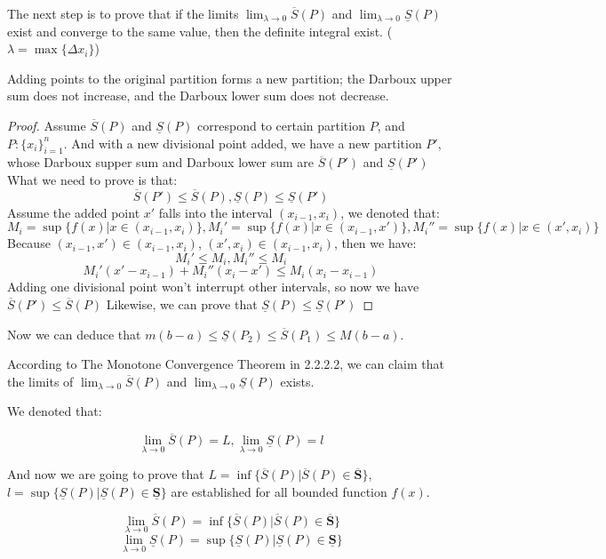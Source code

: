 The next step is to prove that if the limits $\lim_{\lambda \to 0} \overline{S}(P)$ and $\lim_{\lambda \to 0} \underline{S}(P)$ exist and converge to the same value, then the definite integral exist. ($\lambda = \max \{\Delta x_i\}$)

\begin{lemma}
Adding points to the original partition forms a new partition; the Darboux upper sum does not increase, and the Darboux lower sum does not decrease.
\end{lemma}

\begin{proof}
Assume $\overline{S}(P)$ and $\underline{S}(P)$ correspond to certain partition $P$, and $P: \{x_i\}_{i=1}^n$. And with a new divisional point added, we have a new partition $P'$, whose Darboux supper sum and Darboux lower sum are $\overline{S}(P')$ and $\underline{S}(P')$
What we need to prove is that:
\[
\overline{S}(P') \leq \overline{S}(P), \underline{S}(P) \leq \underline{S}(P')
\]
Assume the added point $x'$ falls into the interval $(x_{i-1},x_i)$, we denoted that:
\[
M_i = \sup \{f(x)|x \in (x_{i-1},x_i)\}, M_i' = \sup \{f(x)|x \in (x_{i-1},x')\}, M_i'' = \sup \{f(x)| x \in (x', x_i)\}
\]
Because $(x_{i-1},x') \in (x_{i-1},x_i)$, $(x', x_i) \in (x_{i-1},x_i)$, then we have:
\[
M_i' \leq M_i, M_i'' \leq M_i
\]
\[
M_i'(x'-x_{i-1}) + M_i''(x_i-x') \leq M_i(x_i - x_{i-1})
\]
Adding one divisional point won't interrupt other intervals, so now we have $\overline{S}(P') \leq \overline{S}(P)$
Likewise, we can prove that $\underline{S}(P) \leq \underline{S}(P')$

\end{proof}

Now we can deduce that $m(b-a) \leq \underline{S}(P_2) \leq \overline{S}(P_1) \leq M(b-a)$.

According to The Monotone Convergence Theorem in 2.2.2.2, we can claim that the limits of $\lim_{\lambda \to 0} \overline{S}(P)$ and $\lim_{\lambda \to 0} \underline{S}(P)$ exists.

We denoted that:

\[
\lim_{\lambda \to 0} \overline{S}(P)=L, \lim_{\lambda \to 0} \underline{S}(P)=l
\]

And now we are going to prove that $L = \inf \{\overline{S}(P)|\overline{S}(P) \in \overline{\textbf{S}}\}$, $l = \sup \{\underline{S}(P)|\underline{S}(P) \in \underline{\textbf{S}}\}$ are established for all bounded function $f(x)$.

\begin{lemma}
\[\lim_{\lambda \to 0} \overline{S}(P) = \inf \{\overline{S}(P)|\overline{S}(P) \in \overline{\textbf{S}}\}\]
\[\lim_{\lambda \to 0} \underline{S}(P) = \sup \{\underline{S}(P)|\underline{S}(P) \in \underline{\textbf{S}}\}\]
\end{lemma}

